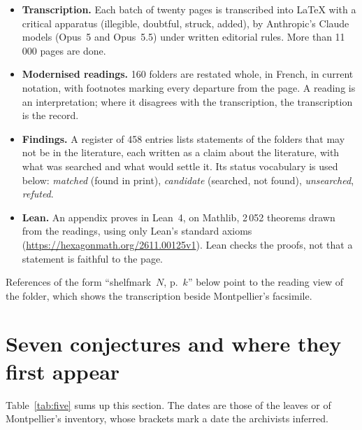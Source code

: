 \documentclass[11pt,a4paper]{article}
\newcommand{\q}[1]{“#1”}
\begin{document}
\begin{itemize}
\item \textbf{Transcription.} Each batch of twenty pages is transcribed into
  LaTeX with a critical apparatus (illegible, doubtful, struck, added), by
  Anthropic's Claude models (Opus~5 and Opus~5.5) under written editorial
  rules. More than 11\,000 pages are done.
\item \textbf{Modernised readings.} 160 folders are restated whole, in French,
  in current notation, with footnotes marking every departure from the page.
  A reading is an interpretation; where it disagrees with the transcription,
  the transcription is the record.
\item \textbf{Findings.} A register of 458 entries lists statements of the
  folders that may not be in the literature, each written as a claim about the
  literature, with what was searched and what would settle it. Its status
  vocabulary is used below: \emph{matched} (found in print), \emph{candidate}
  (searched, not found), \emph{unsearched}, \emph{refuted}.
\item \textbf{Lean.} An appendix proves in Lean~4, on Mathlib, 2\,052
  theorems drawn from the readings, using only Lean's standard axioms
  (\url{https://hexagonmath.org/2611.00125v1}).
  Lean checks the proofs, not that a statement is faithful to the page.
\end{itemize}

References of the form \q{shelfmark~$N$, p.~$k$} below point to the reading
view of the folder, which shows the transcription beside Montpellier's
facsimile.

\section{Seven conjectures and where they first appear}

Table~\ref{tab:five} sums up this section. The dates are those of the leaves or
of Montpellier's inventory, whose brackets mark a date the archivists
inferred.
\end{document}
